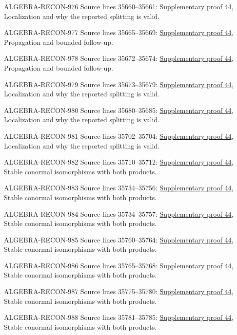 \begin{AlgebraSourceRoutes}
\item[ALGEBRA-RECON-976] Source lines 35660--35661: \hyperlink{algebra_naive_cotangent_notes_20260928}{Supplementary proof 44}, Localization and why the reported splitting is valid.
\item[ALGEBRA-RECON-977] Source lines 35665--35669: \hyperlink{algebra_naive_cotangent_notes_20260928}{Supplementary proof 44}, Propagation and bounded follow-up.
\item[ALGEBRA-RECON-978] Source lines 35672--35674: \hyperlink{algebra_naive_cotangent_notes_20260928}{Supplementary proof 44}, Propagation and bounded follow-up.
\item[ALGEBRA-RECON-979] Source lines 35673--35679: \hyperlink{algebra_naive_cotangent_notes_20260928}{Supplementary proof 44}, Localization and why the reported splitting is valid.
\item[ALGEBRA-RECON-980] Source lines 35680--35685: \hyperlink{algebra_naive_cotangent_notes_20260928}{Supplementary proof 44}, Localization and why the reported splitting is valid.
\item[ALGEBRA-RECON-981] Source lines 35702--35704: \hyperlink{algebra_naive_cotangent_notes_20260928}{Supplementary proof 44}, Localization and why the reported splitting is valid.
\item[ALGEBRA-RECON-982] Source lines 35710--35712: \hyperlink{algebra_naive_cotangent_notes_20260928}{Supplementary proof 44}, Stable conormal isomorphisms with both products.
\item[ALGEBRA-RECON-983] Source lines 35734--35756: \hyperlink{algebra_naive_cotangent_notes_20260928}{Supplementary proof 44}, Stable conormal isomorphisms with both products.
\item[ALGEBRA-RECON-984] Source lines 35734--35757: \hyperlink{algebra_naive_cotangent_notes_20260928}{Supplementary proof 44}, Stable conormal isomorphisms with both products.
\item[ALGEBRA-RECON-985] Source lines 35760--35764: \hyperlink{algebra_naive_cotangent_notes_20260928}{Supplementary proof 44}, Stable conormal isomorphisms with both products.
\item[ALGEBRA-RECON-986] Source lines 35765--35768: \hyperlink{algebra_naive_cotangent_notes_20260928}{Supplementary proof 44}, Stable conormal isomorphisms with both products.
\item[ALGEBRA-RECON-987] Source lines 35775--35780: \hyperlink{algebra_naive_cotangent_notes_20260928}{Supplementary proof 44}, Stable conormal isomorphisms with both products.
\item[ALGEBRA-RECON-988] Source lines 35781--35785: \hyperlink{algebra_naive_cotangent_notes_20260928}{Supplementary proof 44}, Stable conormal isomorphisms with both products.

\end{AlgebraSourceRoutes}
